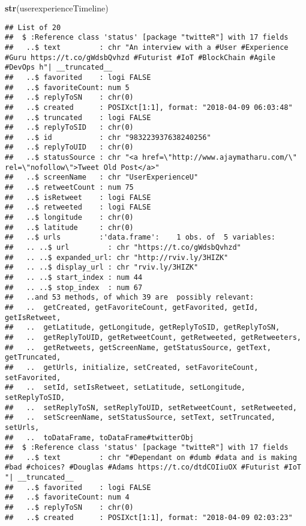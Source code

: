 \documentclass[]{article}
\newenvironment{Shaded}{\begin{snugshade}}{\end{snugshade}}
\newcommand{\KeywordTok}[1]{\textcolor[rgb]{0.13,0.29,0.53}{\textbf{#1}}}
\newcommand{\NormalTok}[1]{#1}
\begin{document}
\begin{Shaded}
\begin{Highlighting}[]
\KeywordTok{str}\NormalTok{(userexperienceTimeline)}
\end{Highlighting}
\end{Shaded}

\begin{verbatim}
## List of 20
##  $ :Reference class 'status' [package "twitteR"] with 17 fields
##   ..$ text         : chr "An interview with a #User #Experience #Guru https://t.co/gWdsbQvhzd #Futurist #IoT #BlockChain #Agile #DevOps h"| __truncated__
##   ..$ favorited    : logi FALSE
##   ..$ favoriteCount: num 5
##   ..$ replyToSN    : chr(0) 
##   ..$ created      : POSIXct[1:1], format: "2018-04-09 06:03:48"
##   ..$ truncated    : logi FALSE
##   ..$ replyToSID   : chr(0) 
##   ..$ id           : chr "983223937638240256"
##   ..$ replyToUID   : chr(0) 
##   ..$ statusSource : chr "<a href=\"http://www.ajaymatharu.com/\" rel=\"nofollow\">Tweet Old Post</a>"
##   ..$ screenName   : chr "UserExperienceU"
##   ..$ retweetCount : num 75
##   ..$ isRetweet    : logi FALSE
##   ..$ retweeted    : logi FALSE
##   ..$ longitude    : chr(0) 
##   ..$ latitude     : chr(0) 
##   ..$ urls         :'data.frame':    1 obs. of  5 variables:
##   .. ..$ url         : chr "https://t.co/gWdsbQvhzd"
##   .. ..$ expanded_url: chr "http://rviv.ly/3HIZK"
##   .. ..$ display_url : chr "rviv.ly/3HIZK"
##   .. ..$ start_index : num 44
##   .. ..$ stop_index  : num 67
##   ..and 53 methods, of which 39 are  possibly relevant:
##   ..  getCreated, getFavoriteCount, getFavorited, getId, getIsRetweet,
##   ..  getLatitude, getLongitude, getReplyToSID, getReplyToSN,
##   ..  getReplyToUID, getRetweetCount, getRetweeted, getRetweeters,
##   ..  getRetweets, getScreenName, getStatusSource, getText, getTruncated,
##   ..  getUrls, initialize, setCreated, setFavoriteCount, setFavorited,
##   ..  setId, setIsRetweet, setLatitude, setLongitude, setReplyToSID,
##   ..  setReplyToSN, setReplyToUID, setRetweetCount, setRetweeted,
##   ..  setScreenName, setStatusSource, setText, setTruncated, setUrls,
##   ..  toDataFrame, toDataFrame#twitterObj
##  $ :Reference class 'status' [package "twitteR"] with 17 fields
##   ..$ text         : chr "#Dependant on #dumb #data and is making #bad #choices? #Douglas #Adams https://t.co/dtdCOIiuOX #Futurist #IoT "| __truncated__
##   ..$ favorited    : logi FALSE
##   ..$ favoriteCount: num 4
##   ..$ replyToSN    : chr(0) 
##   ..$ created      : POSIXct[1:1], format: "2018-04-09 02:03:23"

\end{verbatim}
\end{document}
